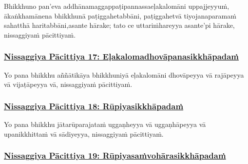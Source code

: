 Bhikkhuno pan'eva addhānamaggappaṭipannassa\makeatletter\hyperlink{endnote194-appendix}\makeatother \thinspace eḷakalomāni uppajjeyyuṁ, ākaṅkhamānena bhikkhunā paṭiggahetabbāni, paṭiggahetvā tiyojanaparamaṁ sahatthā haritabbāni,\makeatletter\hyperlink{endnote195-appendix}\makeatother \thinspace asante hārake; tato ce uttariṁ\makeatletter\hyperlink{endnote196-appendix}\makeatother \thinspace hareyya asante'pi hārake, nissaggiyaṁ pācittiyaṁ.



\subsubsection*{\hyperref[forf-exp17]{Nissaggiya Pācittiya 17: Eḷakalomadhovāpanasikkhāpadaṁ}}
\label{np17}

Yo pana bhikkhu aññātikāya bhikkhuniyā eḷakalomāni dhovāpeyya vā rajāpeyya vā vijaṭāpeyya vā, nissaggiyaṁ pācittiyaṁ.



\subsubsection*{\hyperref[forf-exp18]{Nissaggiya Pācittiya 18: Rūpiyasikkhāpadaṁ}}
\label{np18}

Yo pana bhikkhu jātarūparajataṁ uggaṇheyya vā uggaṇhāpeyya vā upanikkhittaṁ vā sādiyeyya, nissaggiyaṁ pācittiyaṁ.



\subsubsection*{\hyperref[forf-exp19]{Nissaggiya Pācittiya 19: Rūpiyasaṁvohārasikkhāpadaṁ}}
\label{np19}

